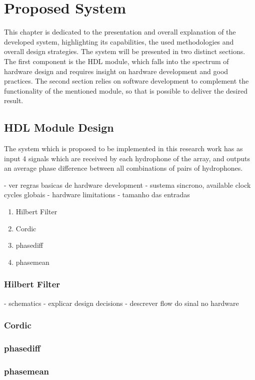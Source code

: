 \chapter{Proposed System} \label{chap:proposed_sys}

This chapter is dedicated to the presentation and overall explanation of the developed system, highlighting its capabilities, the used methodologies and overall design strategies. 
The system will be presented in two distinct sections. The first component is the HDL module, which falls into the spectrum of hardware design and requires insight on hardware development and good practices. The second section relies on software development to complement the functionality of the mentioned module, so that is possible to deliver the desired result.

\section{HDL Module Design}

The system which is proposed to be implemented in this research work has as input 4 signals which are received by each hydrophone of the array, and outputs an average phase difference between all combinations of pairs of hydrophones. 

- ver regras basicas de hardware development
- sustema sincrono, available clock cycles globais
- hardware limitations
- tamanho das entradas


\begin{enumerate}
	\item Hilbert Filter
	\item Cordic
	\item phasediff
	\item phasemean
\end{enumerate}

\subsection{Hilbert Filter}
- schematics
- explicar design decisions
- descrever flow do sinal no hardware

\subsection{Cordic}
\subsection{phasediff}
\subsection{phasemean}

